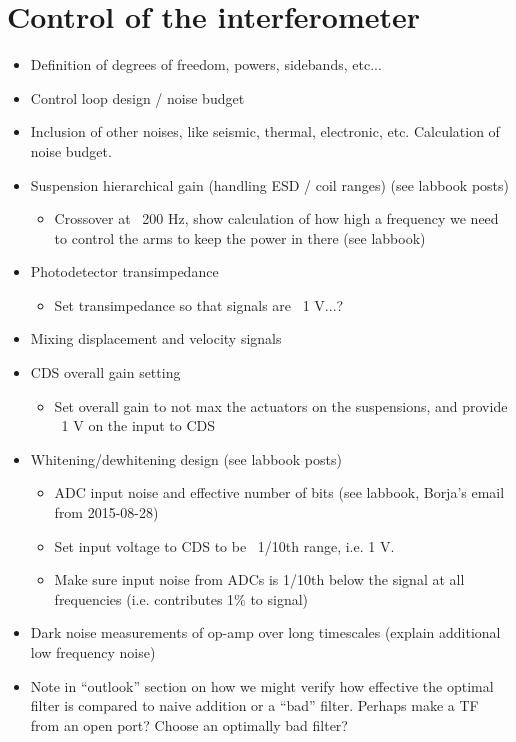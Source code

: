 \chapter{Control of the \SSM{} interferometer}
\label{c:speedmeter-control}


\begin{itemize}
  \item Definition of degrees of freedom, powers, sidebands, etc...
  \item Control loop design / noise budget
  \item Inclusion of other noises, like seismic, thermal, electronic, etc. Calculation of noise budget.
  \item Suspension hierarchical gain (handling ESD / coil ranges) (see labbook posts)
     \begin{itemize}
        \item Crossover at ~200 Hz, show calculation of how high a frequency we need to control the arms to keep the power in there (see labbook)
     \end{itemize}
  \item Photodetector transimpedance
    \begin{itemize}
      \item Set transimpedance so that signals are ~1 V...?
    \end{itemize}
  \item Mixing displacement and velocity signals
  \item CDS overall gain setting
    \begin{itemize}
      \item Set overall gain to not max the actuators on the suspensions, and provide ~1 V on the input to CDS
    \end{itemize}
  \item Whitening/dewhitening design (see labbook posts)
    \begin{itemize}
      \item ADC input noise and effective number of bits (see labbook, Borja's email from 2015-08-28)
      \item Set input voltage to CDS to be ~1/10th range, i.e. 1 V.
      \item Make sure input noise from ADCs is 1/10th below the signal at all frequencies (i.e. contributes 1\% to signal)
    \end{itemize}
  \item Dark noise measurements of op-amp over long timescales (explain additional low frequency noise)
  \item Note in ``outlook'' section on how we might verify how effective the optimal filter is compared to naive addition or a ``bad'' filter. Perhaps make a TF from an open port? Choose an optimally bad filter?
\end{itemize}